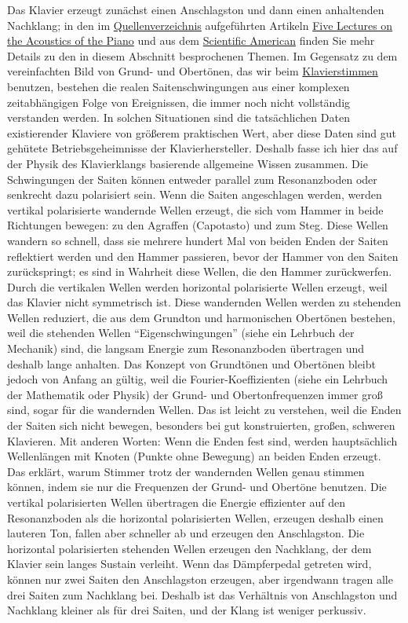 Das Klavier erzeugt zunächst einen Anschlagston und dann einen anhaltenden Nachklang;
in den im \hyperlink{reference}{Quellenverzeichnis} aufgeführten Artikeln \hyperlink{Lectures}{Five Lectures on the Acoustics of the Piano} und aus dem \hyperlink{American}{Scientific American} finden Sie mehr Details zu den in diesem Abschnitt besprochenen Themen.
Im Gegensatz zu dem vereinfachten Bild von Grund- und Obertönen, das wir beim \hyperlink{c2_1}{Klavierstimmen} benutzen, bestehen die realen Saitenschwingungen aus einer komplexen zeitabhängigen Folge von Ereignissen, die immer noch nicht vollständig verstanden werden.
In solchen Situationen sind die tatsächlichen Daten existierender Klaviere von größerem praktischen Wert, aber diese Daten sind gut gehütete Betriebsgeheimnisse der Klavierhersteller.
Deshalb fasse ich hier das auf der Physik des Klavierklangs basierende allgemeine Wissen zusammen.
Die Schwingungen der Saiten können entweder parallel zum Resonanzboden oder senkrecht dazu polarisiert sein.
Wenn die Saiten angeschlagen werden, werden vertikal polarisierte wandernde Wellen erzeugt, die sich vom Hammer in beide Richtungen bewegen: zu den Agraffen (Capotasto) und zum Steg.
Diese Wellen wandern so schnell, dass sie mehrere hundert Mal von beiden Enden der Saiten reflektiert werden und den Hammer passieren, bevor der Hammer von den Saiten zurückspringt;
es sind in Wahrheit diese Wellen, die den Hammer zurückwerfen.
Durch die vertikalen Wellen werden horizontal polarisierte Wellen erzeugt, weil das Klavier nicht symmetrisch ist.
Diese wandernden Wellen werden zu stehenden Wellen reduziert, die aus dem Grundton und harmonischen Obertönen bestehen, weil die stehenden Wellen \enquote{Eigenschwingungen} (siehe ein Lehrbuch der Mechanik) sind, die langsam Energie zum Resonanzboden übertragen und deshalb lange anhalten.
Das Konzept von Grundtönen und Obertönen bleibt jedoch von Anfang an gültig, weil die Fourier-Koeffizienten (siehe ein Lehrbuch der Mathematik oder Physik) der Grund- und Obertonfrequenzen immer groß sind, sogar für die wandernden Wellen.
Das ist leicht zu verstehen, weil die Enden der Saiten sich nicht bewegen, besonders bei gut konstruierten, großen, schweren Klavieren.
Mit anderen Worten: Wenn die Enden fest sind, werden hauptsächlich Wellenlängen mit Knoten (Punkte ohne Bewegung) an beiden Enden erzeugt.
Das erklärt, warum Stimmer trotz der wandernden Wellen genau stimmen können, indem sie nur die Frequenzen der Grund- und Obertöne benutzen.
Die vertikal polarisierten Wellen übertragen die Energie effizienter auf den Resonanzboden als die horizontal polarisierten Wellen, erzeugen deshalb einen lauteren Ton, fallen aber schneller ab und erzeugen den Anschlagston.
Die horizontal polarisierten stehenden Wellen erzeugen den Nachklang, der dem Klavier sein langes Sustain verleiht.
Wenn das Dämpferpedal getreten wird, können nur zwei Saiten den Anschlagston erzeugen, aber irgendwann tragen alle drei Saiten zum Nachklang bei.
Deshalb ist das Verhältnis von Anschlagston und Nachklang kleiner als für drei Saiten, und der Klang ist weniger perkussiv.

